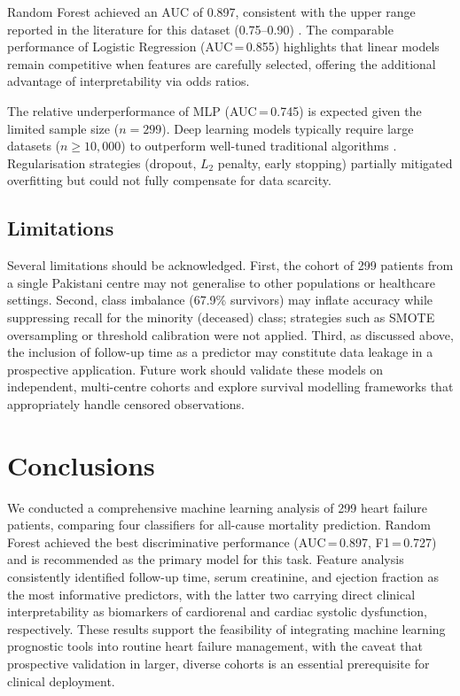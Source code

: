 \documentclass[12pt, a4paper]{article}
\begin{document}
Random Forest achieved an AUC of 0.897, consistent with the upper range 
reported in the literature for this dataset (0.75--0.90) \cite{chicco2020, hu2021}. 
The comparable performance of Logistic Regression (AUC\,=\,0.855) highlights 
that linear models remain competitive when features are carefully selected, 
offering the additional advantage of interpretability via odds ratios.

The relative underperformance of MLP (AUC\,=\,0.745) is expected given the 
limited sample size ($n=299$). Deep learning models typically require large 
datasets ($n \geq 10{,}000$) to outperform well-tuned traditional 
algorithms \cite{shwartz2022}. Regularisation strategies (dropout, 
$L_2$ penalty, early stopping) partially mitigated overfitting but could 
not fully compensate for data scarcity.

\subsection{Limitations}

Several limitations should be acknowledged. First, the cohort of 299 patients 
from a single Pakistani centre may not generalise to other populations or 
healthcare settings. Second, class imbalance (67.9\% survivors) may inflate 
accuracy while suppressing recall for the minority (deceased) class; 
strategies such as SMOTE oversampling or threshold calibration were not 
applied. Third, as discussed above, the inclusion of follow-up time as a 
predictor may constitute data leakage in a prospective application. Future 
work should validate these models on independent, multi-centre cohorts and 
explore survival modelling frameworks that appropriately handle censored 
observations.

\section{Conclusions}
\label{sec:conclusions}

We conducted a comprehensive machine learning analysis of 299 heart failure 
patients, comparing four classifiers for all-cause mortality prediction. 
Random Forest achieved the best discriminative performance (AUC\,=\,0.897, 
F1\,=\,0.727) and is recommended as the primary model for this task. Feature 
analysis consistently identified follow-up time, serum creatinine, and 
ejection fraction as the most informative predictors, with the latter two 
carrying direct clinical interpretability as biomarkers of cardiorenal and 
cardiac systolic dysfunction, respectively. These results support the 
feasibility of integrating machine learning prognostic tools into routine 
heart failure management, with the caveat that prospective validation in 
larger, diverse cohorts is an essential prerequisite for clinical deployment.
\end{document}
